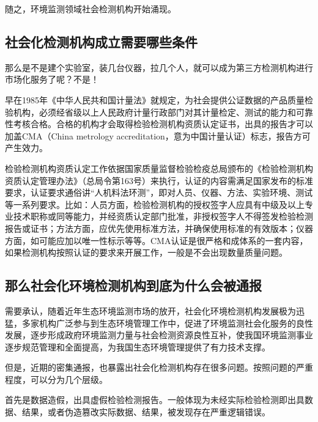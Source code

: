 \documentclass[]{book}
\begin{document}
随之，环境监测领域社会检测机构开始涌现。

\hypertarget{ux793eux4f1aux5316ux68c0ux6d4bux673aux6784ux6210ux7acbux9700ux8981ux54eaux4e9bux6761ux4ef6}{%
\subsection{社会化检测机构成立需要哪些条件}\label{ux793eux4f1aux5316ux68c0ux6d4bux673aux6784ux6210ux7acbux9700ux8981ux54eaux4e9bux6761ux4ef6}}

那么是不是建个实验室，装几台仪器，拉几个人，就可以成为第三方检测机构进行市场化服务了呢？不是！

早在1985年《中华人民共和国计量法》就规定，为社会提供公证数据的产品质量检验机构，必须经省级以上人民政府计量行政部门对其计量检定、测试的能力和可靠性考核合格。合格的机构才会取得检验检测机构资质认定证书，出具的报告才可以加盖CMA（China metrology accreditation，意为中国计量认证）标志，报告方可产生效力。

检验检测机构资质认定工作依据国家质量监督检验检疫总局颁布的《检验检测机构资质认定管理办法》（总局令第163号）来执行，认证的内容需满足国家发布的标准要求，认证要求通俗讲``人机料法环测''，即对人员、仪器、方法、实验环境、测试等一系列要求。比如：人员方面，检验检测机构的授权签字人应具有中级及以上专业技术职称或同等能力，并经资质认定部门批准，非授权签字人不得签发检验检测报告或证书；方法方面，应优先使用标准方法，并确保使用标准的有效版本；仪器方面，如可能应加以唯一性标示等等。CMA认证是很严格和成体系的一套内容，如果检测机构按照认证的要求来开展工作，一般是不会出现数量质量问题。

\hypertarget{ux90a3ux4e48ux793eux4f1aux5316ux73afux5883ux68c0ux6d4bux673aux6784ux5230ux5e95ux4e3aux4ec0ux4e48ux4f1aux88abux901aux62a5}{%
\subsection{那么社会化环境检测机构到底为什么会被通报}\label{ux90a3ux4e48ux793eux4f1aux5316ux73afux5883ux68c0ux6d4bux673aux6784ux5230ux5e95ux4e3aux4ec0ux4e48ux4f1aux88abux901aux62a5}}

需要承认，随着近年生态环境监测市场的放开，社会化环境检测机构发展极为迅猛，多家机构广泛参与到生态环境管理工作中，促进了环境监测社会化服务的良性发展，逐步形成政府环境监测力量与社会检测资源良性互补，使我国环境监测事业逐步规范管理和全面提高，为我国生态环境管理提供了有力技术支撑。

但是，近期的密集通报，也暴露出社会化检测机构存在很多问题。按照问题的严重程度，可以分为几个层级。

首先是数据造假，出具虚假检验检测报告。一般体现为未经实际检验检测即出具数据、结果，或者伪造篡改实际数据、结果，被发现存在严重逻辑错误。
\end{document}
